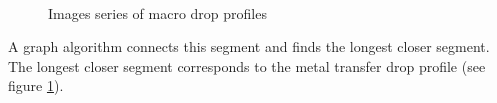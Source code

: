 \documentclass[12pt]{iopart}
\begin{document}
\begin{figure}[h!]
\begin{center}    
\\
\end{center}
\caption{{\small Images series of macro drop profiles}}
\label{fig::photo-results-droplet}
\end{figure}

A graph algorithm connects this segment and finds the longest closer segment.
 The longest closer segment corresponds to the metal transfer drop profile 
(see figure \ref{fig::photo-results-droplet}).
\end{document}
